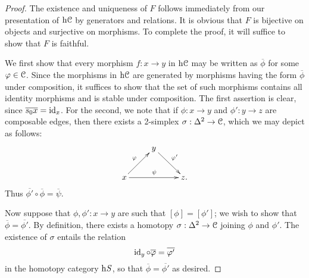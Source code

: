 \begin{1.2.3 The homotopy category}
\begin{proof}
The existence and uniqueness of $F$ follows immediately from our presentation
of $\rm{h} \it{\operatorname{\mathcal{C}}}$ by generators and relations. It is obvious that $F$ is bijective on objects and surjective on morphisms. To complete the proof, it will suffice to show that $F$ is faithful.

We first show that every morphism $f: x \rightarrow y$ in $\rm{h} \it{\operatorname{\mathcal{C}}}$ may be written as $\overline{\phi}$ for some $\varphi \in \operatorname{\mathcal{C}}$. Since the morphisms in $\rm{h} \it{\operatorname{\mathcal{C}}}$ are generated by morphisms having the form $\overline{\phi}$ under composition, it suffices to show that the set of such morphisms contains all identity morphisms and is stable under composition. The first assertion is clear, since $\overline{ s_0 x}=\operatorname{id}_x$. For the second, we note that if $\phi: x \rightarrow y$ and $\phi': y \rightarrow z$ are composable edges, then there exists a 2-simplex $\sigma: \Delta^2 \rightarrow \operatorname{\mathcal{C}}$, which we may depict as follows:
$$ \xymatrix{ & y \ar[dr]^{\phi'} & \\
x \ar[ur]^{\phi} \ar[rr]^{\psi} & & z. }$$
Thus $\overline{ \phi' } \circ \overline{\phi} = \overline{ \psi }$.

Now suppose that $\phi,\phi': x \rightarrow y$ are such that $[\phi]=[\phi']$; we wish to show that $\overline{\phi}=\overline{\phi'}$. By definition, there exists a homotopy $\sigma: \Delta^2 \rightarrow \operatorname{\mathcal{C}}$ joining $\phi$ and $\phi'$. The existence of $\sigma$ entails the relation
$$ \operatorname{id}_y \circ \overline{\varphi} = \overline{\varphi'} $$ in the homotopy category $\rm{h} \it{S}$, so that
$\overline{\phi} = \overline{\phi'}$ as desired.
\end{proof}
\end{1.2.3 The homotopy category}
